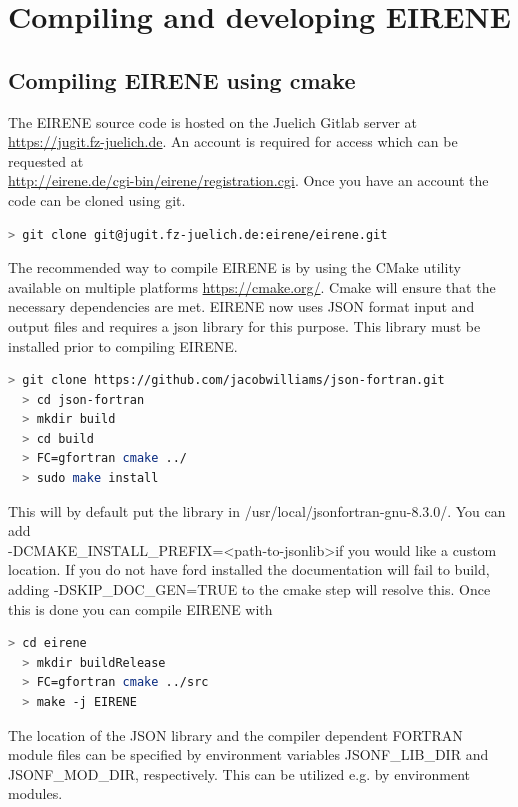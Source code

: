 \chapter{Compiling and developing EIRENE}
\label{sec5}
\section{Compiling EIRENE using cmake}
The EIRENE source code is hosted on the Juelich Gitlab server at \url{https://jugit.fz-juelich.de}. An account is required for access which can be requested at \\ \url{http://eirene.de/cgi-bin/eirene/registration.cgi}. Once you have an account the code can be cloned using git.

\begin{lstlisting}[language=bash,columns=fullflexible]
  > git clone git@jugit.fz-juelich.de:eirene/eirene.git
\end{lstlisting}

The recommended way to compile EIRENE is by using the CMake utility available on multiple platforms \url{https://cmake.org/}. Cmake will ensure that the necessary dependencies are met. EIRENE now uses JSON format input and output files and requires a json library for this purpose. This library must be installed prior to compiling EIRENE.

\begin{lstlisting}[language=bash,columns=fullflexible]
  > git clone https://github.com/jacobwilliams/json-fortran.git
  > cd json-fortran
  > mkdir build
  > cd build
  > FC=gfortran cmake ../
  > sudo make install
\end{lstlisting}

This will by default put the library in /usr/local/jsonfortran-gnu-8.3.0/. You can add \\ -DCMAKE\_INSTALL\_PREFIX=\textless path-to-jsonlib\textgreater if you would like a custom location. If you do not have ford installed the documentation will fail to build, adding -DSKIP\_DOC\_GEN=TRUE to the cmake step will resolve this. Once this is done you can compile EIRENE with

\begin{lstlisting}[language=bash,columns=fullflexible]
  > cd eirene
  > mkdir buildRelease
  > FC=gfortran cmake ../src
  > make -j EIRENE
\end{lstlisting}

The location of the JSON library and the compiler dependent FORTRAN module
files can be specified by environment variables JSONF\_LIB\_DIR and
JSONF\_MOD\_DIR, respectively. This can be utilized e.g. by environment
modules.

